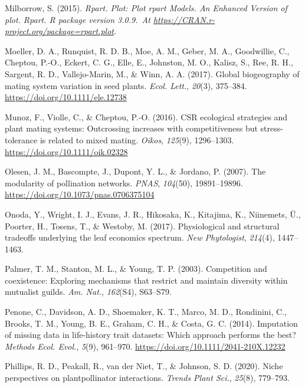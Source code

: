 \documentclass[
  12pt,
  a4paper,
]{article}
\newlength{\cslhangindent}
\newlength{\cslentryspacingunit} %
\newenvironment{CSLReferences}[2] %
 {%
  \setlength{\parindent}{0pt}
  \ifodd #1
  \let\oldpar\par
  \def\par{\hangindent=\cslhangindent\oldpar}
  \fi
  \setlength{\parskip}{#2\cslentryspacingunit}
 }%
 {}
\begin{document}
\begin{CSLReferences}{1}{0}
\leavevmode{}%
Milborrow, S. (2015). \emph{Rpart. Plot: {Plot} rpart {Models}. {An Enhanced Version} of plot. Rpart. R package version 3.0.9.~At \href{https://CRAN.R-project.org/package=rpart.plot}{https://CRAN.r-project.org/package=rpart.plot}}.

\leavevmode{}%
Moeller, D. A., Runquist, R. D. B., Moe, A. M., Geber, M. A., Goodwillie, C., Cheptou, P.-O., Eckert, C. G., Elle, E., Johnston, M. O., Kalisz, S., Ree, R. H., Sargent, R. D., Vallejo-Marin, M., \& Winn, A. A. (2017). Global biogeography of mating system variation in seed plants. \emph{Ecol. Lett.}, \emph{20}(3), 375--384. \url{https://doi.org/10.1111/ele.12738}

\leavevmode{}%
Munoz, F., Violle, C., \& Cheptou, P.-O. (2016). {CSR} ecological strategies and plant mating systems: Outcrossing increases with competitiveness but stress-tolerance is related to mixed mating. \emph{Oikos}, \emph{125}(9), 1296--1303. \url{https://doi.org/10.1111/oik.02328}

\leavevmode{}%
Olesen, J. M., Bascompte, J., Dupont, Y. L., \& Jordano, P. (2007). The modularity of pollination networks. \emph{PNAS}, \emph{104}(50), 19891--19896. \url{https://doi.org/10.1073/pnas.0706375104}

\leavevmode{}%
Onoda, Y., Wright, I. J., Evans, J. R., Hikosaka, K., Kitajima, K., Niinemets, Ü., Poorter, H., Tosens, T., \& Westoby, M. (2017). Physiological and structural tradeoffs underlying the leaf economics spectrum. \emph{New Phytologist}, \emph{214}(4), 1447--1463.

\leavevmode{}%
Palmer, T. M., Stanton, M. L., \& Young, T. P. (2003). Competition and coexistence: Exploring mechanisms that restrict and maintain diversity within mutualist guilds. \emph{Am. Nat.}, \emph{162}(S4), S63--S79.

\leavevmode{}%
Penone, C., Davidson, A. D., Shoemaker, K. T., Marco, M. D., Rondinini, C., Brooks, T. M., Young, B. E., Graham, C. H., \& Costa, G. C. (2014). Imputation of missing data in life-history trait datasets: Which approach performs the best? \emph{Methods Ecol. Evol.}, \emph{5}(9), 961--970. \url{https://doi.org/10.1111/2041-210X.12232}

\leavevmode{}%
Phillips, R. D., Peakall, R., van der Niet, T., \& Johnson, S. D. (2020). Niche perspectives on plant\textendash pollinator interactions. \emph{Trends Plant Sci.}, \emph{25}(8), 779--793.


\end{CSLReferences}
\end{document}

